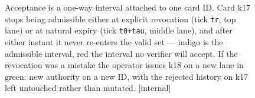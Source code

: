 \begin{figure}[H]
\caption{Acceptance is a one-way interval attached to one card ID. Card k17
stops being admissible either at explicit revocation (tick \texttt{tr}, top
lane) or at natural expiry (tick \texttt{t0+tau}, middle lane), and after
either instant it never re-enters the valid set --- indigo is the admissible
interval, red the interval no verifier will accept. If the revocation was a
mistake the operator issues k18 on a new lane in green: new authority on a new
ID, with the rejected history on k17 left untouched rather than mutated.
[internal]}
\label{fig:anchor-card-lifecycle}
\end{figure}
